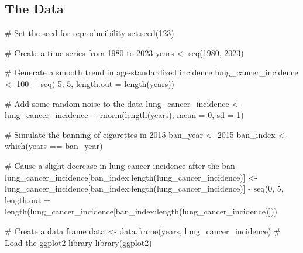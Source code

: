 \documentclass[
  letterpaper,
  DIV=11,
  numbers=noendperiod]{scrartcl}
\newenvironment{Shaded}{\begin{snugshade}}{\end{snugshade}}
\newcommand{\AttributeTok}[1]{\textcolor[rgb]{0.40,0.45,0.13}{#1}}
\newcommand{\CommentTok}[1]{\textcolor[rgb]{0.37,0.37,0.37}{#1}}
\newcommand{\DecValTok}[1]{\textcolor[rgb]{0.68,0.00,0.00}{#1}}
\newcommand{\FunctionTok}[1]{\textcolor[rgb]{0.28,0.35,0.67}{#1}}
\newcommand{\NormalTok}[1]{\textcolor[rgb]{0.00,0.23,0.31}{#1}}
\newcommand{\OtherTok}[1]{\textcolor[rgb]{0.00,0.23,0.31}{#1}}
\newcommand{\SpecialCharTok}[1]{\textcolor[rgb]{0.37,0.37,0.37}{#1}}
\begin{document}
\hypertarget{the-data}{%
\subsection{The Data}\label{the-data}}

\begin{Shaded}
\begin{Highlighting}[]
\CommentTok{\# Set the seed for reproducibility}
\FunctionTok{set.seed}\NormalTok{(}\DecValTok{123}\NormalTok{)}

\CommentTok{\# Create a time series from 1980 to 2023}
\NormalTok{years }\OtherTok{\textless{}{-}} \FunctionTok{seq}\NormalTok{(}\DecValTok{1980}\NormalTok{, }\DecValTok{2023}\NormalTok{)}

\CommentTok{\# Generate a smooth trend in age{-}standardized incidence}
\NormalTok{lung\_cancer\_incidence }\OtherTok{\textless{}{-}} \DecValTok{100} \SpecialCharTok{+} \FunctionTok{seq}\NormalTok{(}\SpecialCharTok{{-}}\DecValTok{5}\NormalTok{, }\DecValTok{5}\NormalTok{, }\AttributeTok{length.out =} \FunctionTok{length}\NormalTok{(years))}

\CommentTok{\# Add some random noise to the data}
\NormalTok{lung\_cancer\_incidence }\OtherTok{\textless{}{-}}\NormalTok{ lung\_cancer\_incidence }\SpecialCharTok{+} \FunctionTok{rnorm}\NormalTok{(}\FunctionTok{length}\NormalTok{(years), }\AttributeTok{mean =} \DecValTok{0}\NormalTok{, }\AttributeTok{sd =} \DecValTok{1}\NormalTok{)}

\CommentTok{\# Simulate the banning of cigarettes in 2015}
\NormalTok{ban\_year }\OtherTok{\textless{}{-}} \DecValTok{2015}
\NormalTok{ban\_index }\OtherTok{\textless{}{-}} \FunctionTok{which}\NormalTok{(years }\SpecialCharTok{==}\NormalTok{ ban\_year)}

\CommentTok{\# Cause a slight decrease in lung cancer incidence after the ban}
\NormalTok{lung\_cancer\_incidence[ban\_index}\SpecialCharTok{:}\FunctionTok{length}\NormalTok{(lung\_cancer\_incidence)] }\OtherTok{\textless{}{-}}\NormalTok{ lung\_cancer\_incidence[ban\_index}\SpecialCharTok{:}\FunctionTok{length}\NormalTok{(lung\_cancer\_incidence)] }\SpecialCharTok{{-}} \FunctionTok{seq}\NormalTok{(}\DecValTok{0}\NormalTok{, }\DecValTok{5}\NormalTok{, }\AttributeTok{length.out =} \FunctionTok{length}\NormalTok{(lung\_cancer\_incidence[ban\_index}\SpecialCharTok{:}\FunctionTok{length}\NormalTok{(lung\_cancer\_incidence)]))}

\CommentTok{\# Create a data frame}
\NormalTok{data }\OtherTok{\textless{}{-}} \FunctionTok{data.frame}\NormalTok{(years, lung\_cancer\_incidence)}
\CommentTok{\# Load the ggplot2 library}
\FunctionTok{library}\NormalTok{(ggplot2)}


\end{Highlighting}
\end{Shaded}
\end{document}

